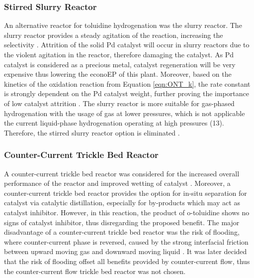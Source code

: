 \subsubsection{Stirred Slurry Reactor}
An alternative reactor for toluidine hydrogenation was the slurry reactor. The slurry reactor provides a steady agitation of the reaction, increasing the selectivity \cite{p_a_ramachandran_recent_1987}. Attrition of the solid Pd catalyst will occur in slurry reactors due to the violent agitation in the reactor, therefore damaging the catalyst. As Pd catalyst is considered as a precious metal, catalyst regeneration will be very expensive thus lowering the econoEP of this plant. Moreover, based on the kinetics of the oxidation reaction from Equation \ref{eqn:ONT_k}, the rate constant is strongly dependent on the Pd catalyst weight, further proving the importance of low catalyst attrition \cite{rajadhyaksha_solvent_1986}.
The slurry reactor is more suitable for gas-phased hydrogenation with the usage of  gas at lower pressures, which is not applicable the current liquid-phase hydrogenation operating at high pressures (\SI{13}{\atm}). Therefore, the stirred slurry reactor option is eliminated \cite{ranade_chapter_2011}.


\subsubsection{Counter-Current Trickle Bed Reactor}
A counter-current trickle bed reactor was considered for the increased overall performance of the reactor and improved wetting of catalyst \cite{kundu_novel_2003}. Moreover, a counter-current trickle bed reactor provides the option for in-situ separation for catalyst via catalytic distillation, especially for by-products which may act as catalyst inhibitor. However, in this reaction, the product of o-toluidine shows no signs of catalyst inhibitor, thus disregarding the proposed benefit. The major disadvantage of a counter-current trickle bed reactor was the risk of flooding, where counter-current phase is reversed, caused by the strong interfacial friction between upward moving gas and downward moving liquid \cite{breijer_prevention_2008}. It was later decided that the risk of flooding offset all benefits provided by counter-current flow, thus the counter-current flow trickle bed reactor was not chosen. 

